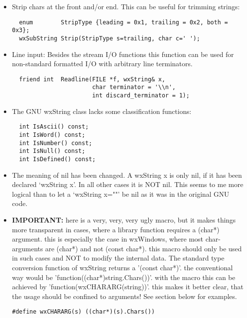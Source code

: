 \begin{itemize}
\item Strip chars at the front and/or end.
This can be useful for trimming strings:
\begin{verbatim}
  enum        StripType {leading = 0x1, trailing = 0x2, both = 0x3};
  wxSubString Strip(StripType s=trailing, char c=' ');
\end{verbatim}
  
\item Line input:  
Besides the stream I/O functions this function can be used for non-standard
formatted I/O with arbitrary line terminators.                            
\begin{verbatim}
  friend int  Readline(FILE *f, wxString& x, 
                       char terminator = '\\n',
                       int discard_terminator = 1);
\end{verbatim}

\item The GNU wxString class lacks some classification functions:
\begin{verbatim}
  int IsAscii() const;
  int IsWord() const;
  int IsNumber() const;
  int IsNull() const;
  int IsDefined() const;
\end{verbatim}

\item The meaning of nil has been changed. A wxString x is only nil, if it
has been declared `wxString x'. In all other cases it is NOT nil. This
seems to me more logical than to let a `wxString x=""' be nil as it
was in the original GNU code.

\item {\bf IMPORTANT:}
 here is a very, very, very ugly macro, but it makes things more
transparent in cases, where a library function requires a 
(char*) argument. this is especially the case in wxWindows,
where most char-arguments are (char*) and not (const char*).
this macro should only be used in such cases and NOT to
modify the internal data. The standard type conversion function
of wxString returns a '(const char*)'.
the conventional way would be 'function((char*)string.Chars())'.
with the macro this can be achieved by 'function(wxCHARARG(string))'.
this makes it better clear, that the usage should be confined
to arguments! See section below for examples.
\begin{verbatim}
#define wxCHARARG(s) ((char*)(s).Chars())  
\end{verbatim}

\end{itemize}

